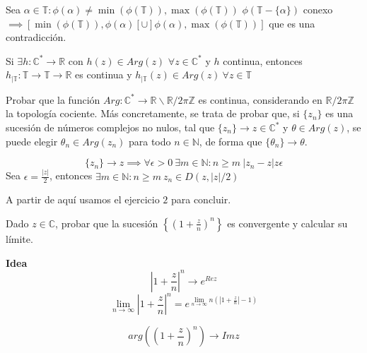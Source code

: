 Sea $\alpha\in\mathbb{T} : \phi(\alpha) \not =\min(\phi(\mathbb{T})), \max(\phi(\mathbb{T}))$ 
$\phi ( \mathbb{T}-\{ \alpha \} )$ conexo $\implies [ \min(\phi(\mathbb{T})), \phi(\alpha)[ \cup ]\phi(\alpha), \max( \phi(\mathbb{T}) ) ] $ que es una contradicción.

Si $\exists h:\mathbb{C}^{\ast} \rightarrow \mathbb{R}$ con $h(z)\in Arg(z)$ $\forall z\in\mathbb{C}^{\ast}$ y $h$ continua, entonces
$h_{| \mathbb{T}} : \mathbb{T} \rightarrow \mathbb{T} \rightarrow \mathbb{R}$ es continua y $h_{|\mathbb{T}} (z) \in Arg(z) \ \forall z\in\mathbb{T}$


\begin{ejer}
	Probar que la función $Arg : \mathbb{C}^{\ast} \rightarrow \mathbb{R}\backslash \mathbb{R}/2\pi\mathbb{Z}$ es continua, considerando en $\mathbb{R}/2\pi\mathbb{Z}$ la topología cociente. Más concretamente, se trata de probar que, si $\{z_n\}$ es una sucesión de números complejos no nulos, tal que $\{z_n\} \rightarrow z\in\mathbb{C}^{\ast}$ y $\theta\in Arg(z)$, se puede elegir $\theta_n\in Arg(z_n)$ para todo $n\in\mathbb{N}$, de forma que $\{ \theta_n \} \rightarrow \theta$.
\end{ejer}




\begin{sol}


$$
\{ z_n \} \rightarrow z \implies \forall \epsilon>0\ \exists m\in\mathbb{N} : n\geq m \ |z_n-z|z\epsilon
$$
Sea $\epsilon = \frac{|z|}{2}$, entonces 
$\exists m\in\mathbb{N} :  n\geq m\ z_n\in D(z, |z|/2)$

A partir de aquí usamos el ejercicio $2$ para concluir.
\end{sol}



\begin{ejer}
	Dado $z\in\mathbb{C}$, probar que la sucesión $\left\{ \left( 1+\frac{z}{n} \right)^n \right\}$ es convergente y calcular su límite.
\end{ejer}


\textbf{Idea}
$$
|1+\frac{z}{n}|^n \rightarrow e^{Re z}
$$
$$
\lim_{n\rightarrow\infty} |1+\frac{z}{n}|^n 
= e^{ \lim_{n\rightarrow\infty} n(|1+\frac{z}{n}|-1) }
$$

$$
arg((1+\frac{z}{n})^n) \rightarrow Im z
$$

